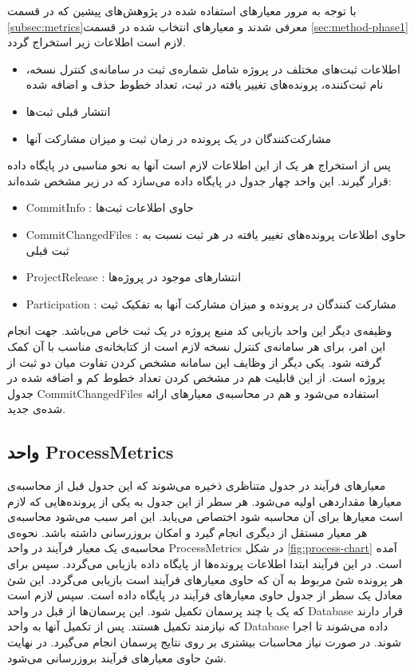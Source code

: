 با توجه به مرور معیارهای استفاده شده در پژوهش‌های پیشین که در قسمت \ref{subsec:metrics}‌معرفی شدند و معیارهای انتخاب شده در قسمت \ref{sec:method-phase1}  لازم است اطلاعات زیر استخراج گردد.
\begin{itemize}
\item
اطلاعات ثبت‌های مختلف در پروژه شامل شماره‌ی ثبت در سامانه‌ی کنترل نسخه، نام ثبت‌کننده، پرونده‌های تغییر یافته در ثبت، تعداد خطوط حذف و اضافه شده
\item
انتشار قبلی ثبت‌ها
\item
مشارکت‌کنندگان در یک پرونده در زمان ثبت و میزان مشارکت آنها

\end{itemize}

پس از استخراج هر یک از این اطلاعات لازم است آنها به نحو مناسبی در پایگاه داده قرار گیرند. این واحد چهار جدول در پایگاه داده می‌سازد که در زیر مشخص شده‌اند:
\begin{itemize}
\item CommitInfo :
حاوی اطلاعات ثبت‌ها
\item CommitChangedFiles : 
حاوی اطلاعات پرونده‌های تغییر یافته در هر ثبت نسبت به ثبت قبلی
\item ProjectRelease :
انتشارهای موجود در پروژه‌ها
\item Participation :
مشارکت کنندگان در پرونده و میزان مشارکت آنها به تفکیک ثبت
\end{itemize}

وظیفه‌ی دیگر این واحد بازیابی کد منبع  پروژه در یک ثبت خاص  می‌باشد.  جهت انجام این امر،  برای هر سامانه‌ی کنترل نسخه لازم است از کتابخانه‌ی مناسب با آن کمک گرفته شود. یکی دیگر از وظایف این سامانه مشخص کردن تفاوت میان دو ثبت از پروژه است. از این قابلیت هم در مشخص کردن تعداد خطوط کم و اضافه شده در جدول CommitChangedFiles استفاده می‌شود و هم در محاسبه‌ی معیارهای ارائه شده‌ی جدید. 

\subsection{واحد ProcessMetrics}
معیارهای فرآیند در جدول متناظری ذخیره می‌شوند که  این جدول قبل از محاسبه‌ی معیارها مقداردهی اولیه می‌شود. هر سطر از این جدول به یکی از پرونده‌هایی که لازم است معیارها برای آن محاسبه شود اختصاص می‌یابد. این امر سبب می‌شود محاسبه‌ی هر معیار مستقل از دیگری انجام گیرد و امکان بروزرسانی داشته باشد. نحوه‌ی محاسبه‌ی یک معیار فرآیند در واحد ProcessMetrics در شکل \ref{fig:process-chart}  آمده است. در این فرآیند ابتدا اطلاعات پرونده‌ها از پایگاه داده بازیابی می‌گردد. سپس برای هر پرونده شئ مربوط به آن که حاوی معیارهای فرآیند است بازیابی می‌گردد. این شئ معادل یک سطر از جدول حاوی معیارهای فرآیند در پایگاه داده است. سپس لازم است که یک یا چند پرسمان تکمیل شود. این پرسمان‌ها از قبل در واحد Database  قرار دارند که نیازمند تکمیل هستند. پس از تکمیل آنها به واحد Database داده می‌شوند تا اجرا شوند. در صورت نیاز محاسبات بیشتری بر روی نتایج پرسمان انجام می‌گیرد. در نهایت شئ حاوی معیارهای فرآیند بروزرسانی می‌شود. 

